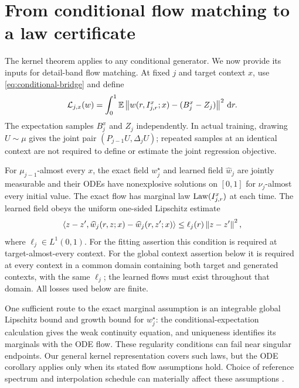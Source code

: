 \section{From conditional flow matching to a law certificate}\label{sec:fm}
The kernel theorem applies to any conditional generator. We now provide its inputs for detail-band flow matching. At fixed $j$ and target context $x$, use \eqref{eq:conditional-bridge} and define
\begin{equation}\label{eq:conditional-loss}
 \mathcal L_{j,x}(w)=\int_0^1\mathbb E\left\lVert
 w(r,I^x_{j,r};x)-(B_j^x-Z_j)\right\rVert^2\,\mathrm d r.
\end{equation}
The expectation samples $B_j^x$ and $Z_j$ independently. In actual training, drawing $U\sim\mu$ gives the joint pair $(P_{j-1}U,\Delta_jU)$; repeated samples at an identical context are not required to define or estimate the joint regression objective.

\begin{assumption}\label{ass:regular}
For $\mu_{j-1}$-almost every $x$, the exact field $w_j^\star$ and learned field $\widehat w_j$ are jointly measurable and their ODEs have nonexplosive solutions on $[0,1]$ for $\nu_j$-almost every initial value. The exact flow has marginal law $\operatorname{Law}(I^x_{j,r})$ at each time. The learned field obeys the uniform one-sided Lipschitz estimate
\begin{equation}\label{eq:osl}
 \left\langle z-z',\widehat w_j(r,z;x)-\widehat w_j(r,z';x)\right\rangle
 \le\ell_j(r)\left\lVert z-z'\right\rVert^2,
\end{equation}
where $\ell_j\in L^1(0,1)$. For the fitting assertion this condition is required at target-almost-every context. For the global context assertion below it is required at every context in a common domain containing both target and generated contexts, with the same $\ell_j$; the learned flows must exist throughout that domain. All losses used below are finite.
\end{assumption}
One sufficient route to the exact marginal assumption is an integrable global Lipschitz bound and growth bound for $w_j^\star$: the conditional-expectation calculation gives the weak continuity equation, and uniqueness identifies its marginals with the ODE flow. These regularity conditions can fail near singular endpoints. Our general kernel representation covers such laws, but the ODE corollary applies only when its stated flow assumptions hold. Choice of reference spectrum and interpolation schedule can materially affect these assumptions \citep{chen2026}.

